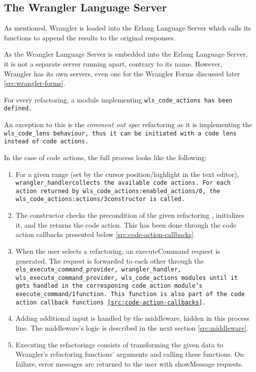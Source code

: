 \subsection{The Wrangler Language Server}

As mentioned, Wrangler is loaded into the Erlang Language Server which calls its functions to append the results to the original responses. 

\begin{note}
As the Wrangler Language Server is embedded into the Erlang Language Server, it is not a separate server running apart, contrary to its name. However, Wrangler has its own servers, even one for the Wrangler Forms discussed later \ref{src:wrangler-forms}.
\end{note}

For every refactoring, a module implementing \tt wls\_code\_actions\rm\ has been defined.

An exception to this is the \textit{comment out spec} refactoring as it is implementing the \tt wls\_code\_lens\rm\ behaviour, thus it can be initiated with a code lens instead of code actions. 


In the case of code actions, the full process looks like the following:
\begin{enumerate}
    \item For a given range (set by the cursor position/highlight in the text editor), \tt wrangler\_handler\rm collects the available code actions. For each action returned by \tt wls\_code\_actions:enabled\_actions/0\rm , the \tt wls\_code\_actions:actions/3\rm constructor is called.
    \item The constructor checks the precondition of the given refactoring , initializes it, and the returns the code action. This has been done through the code action callbacks presented below \ref{src:code-action-callbacks}.
    \item When the user selects a refactoring, an executeCommand request is generated. The request is forwarded to each other through the \tt els\_execute\_command\_provider, wrangler\_handler, wls\_execute\_command\_provider, wls\_code\_actions \rm modules until it gets handled in the corresponing code action module's \tt execute\_command/1\rm function. This function is also part of the code action callback functions \ref{src:code-action-callbacks}.
    \item Adding additional input is handled by the middleware, hidden in this process line. The middleware's logic is described in the next section \ref{src:middleware}.
    \item Executing the refactorings consists of transforming the given data to Wrangler's refactoring functions' arguments and calling these functions. On failure, error messages are returned to the user with showMessage requests. 
    
\end{enumerate}


